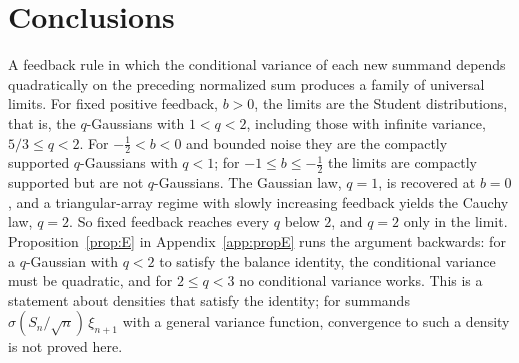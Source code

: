 \documentclass[aip,jmp,preprint,onecolumn,floatfix,superscriptaddress,nofootinbib,11pt]{revtex4-2}
\theoremstyle{plain}
\theoremstyle{remark}
\numberwithin{equation}{section}
\begin{document}
\section{Conclusions}\label{sec:concl}
 
A feedback rule in which the conditional variance of each new summand depends quadratically on the preceding normalized sum produces a family of universal limits. For fixed positive feedback, $b>0$, the limits are the Student distributions, that is, the $q$-Gaussians with $1<q<2$, including those with infinite variance, $5/3\le q<2$. For $-\tfrac12<b<0$ and bounded noise they are the compactly supported $q$-Gaussians with $q<1$; for $-1\le b\le-\tfrac12$ the limits are compactly supported but are not $q$-Gaussians. The Gaussian law, $q=1$, is recovered at $b=0$, and a triangular-array regime with slowly increasing feedback yields the Cauchy law, $q=2$. So fixed feedback reaches every $q$ below $2$, and $q=2$ only in the limit. Proposition~\ref{prop:E} in Appendix~\ref{app:propE} runs the argument backwards: for a $q$-Gaussian with $q<2$ to satisfy the balance identity, the conditional variance must be quadratic, and for $2\le q<3$ no conditional variance works. This is a statement about densities that satisfy the identity; for summands $\sigma(S_n/\sqrt n)\,\xi_{n+1}$ with a general variance function, convergence to such a density is not proved here.
 
\end{document}
